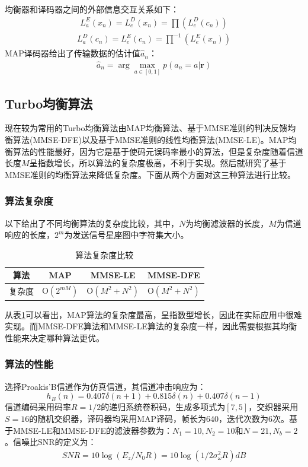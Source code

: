 均衡器和译码器之间的外部信息交互关系如下：
\begin{eqnarray}
    L_a^E(x_n)=L_e^D(x_n)=\prod(L_e^D(c_n))
    \label{equ:2.35}
\end{eqnarray}
\begin{eqnarray}
    L_a^D(c_n)=L_e^E(c_n)=\prod^{-1}(L_e^E(x_n))
    \label{equ:2.36}
\end{eqnarray}
MAP译码器给出了传输数据的估计值$\hat{a}_n$：
\begin{eqnarray}
    \hat{a}_n=\arg\max_{a\in[0,1]}p(a_n=a|\mathbf{r})
    \label{equ:2.36}
\end{eqnarray}
\subsection{Turbo均衡算法}
现在较为常用的Turbo均衡算法由MAP均衡算法、基于MMSE准则的判决反馈均衡算法(MMSE-DFE)以及基于MMSE准则的线性均衡算法(MMSE-LE)。MAP均衡算法的性能最好，因为它是基于使码元误码率最小的算法，但是复杂度随着信道长度$M$呈指数增长，所以算法的复杂度极高，不利于实现。然后就研究了基于MMSE准则的均衡算法来降低复杂度。下面从两个方面对这三种算法进行比较。

\subsubsection*{算法复杂度}
以下给出了不同均衡算法的复杂度比较，其中，$N$为均衡滤波器的长度，$M$为信道响应的长度，$2^m$为发送信号星座图中字符集大小。

\begin{table}
  \centering
  \caption{算法复杂度比较}
  \label{tab:2.1}
  \begin{threeparttable}
  \begin{tabular}{cccc}
    \hline
    算法&MAP&MMSE-LE&MMSE-DFE\\
    \hline
    复杂度&$\mathrm{O}(2^{mM})$&$\mathrm{O}(M^2+N^2)$&$\mathrm{O}(M^2+N^2)$\\
    \hline
  \end{tabular}
\end{threeparttable}
\end{table}

从表\ref{tab:2.1}可以看出，MAP算法的复杂度最高，呈指数型增长，因此在实际应用中很难实现。而MMSE-DFE算法和MMSE-LE算法的复杂度一样，因此需要根据其均衡性能来决定哪种算法更优。
\subsubsection*{算法的性能}
选择Proakis'B信道作为仿真信道，其信道冲击响应为：
\begin{equation}
    h_B(n)=0.407\delta(n+1)+0.815\delta(n)+0.407\delta(n-1)
    \label{equ:2.36}
\end{equation}
信道编码采用码率$R=1/2$的递归系统卷积码，生成多项式为$[7,5]$，交织器采用$S=16$的随机交织器，译码器均采用MAP译码，帧长为640，迭代次数为6次。基于MMSE-LE和MMSE-DFE的滤波器参数为：$N_1=10,N_2=10$和$N=21,N_b=2$。信噪比SNR的定义为：
\begin{eqnarray}
    SNR=10\log(E_z/N_0R)=10\log(1/2\sigma^2_\omega R)dB
    \label{equ:2.37}
\end{eqnarray}

